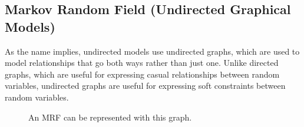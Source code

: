 \subsection{Markov Random Field (Undirected Graphical Models)}

  As the name implies, undirected models use undirected graphs, which are used to model relationships that go both ways rather than just one. Unlike directed graphs, which are useful for expressing casual relationships between random variables, undirected graphs are useful for expressing soft constraints between random variables.  

  \begin{figure}[H]
    \centering 
    \caption{An MRF can be represented with this graph.} 
    \label{fig:mrf_graph}
  \end{figure}

